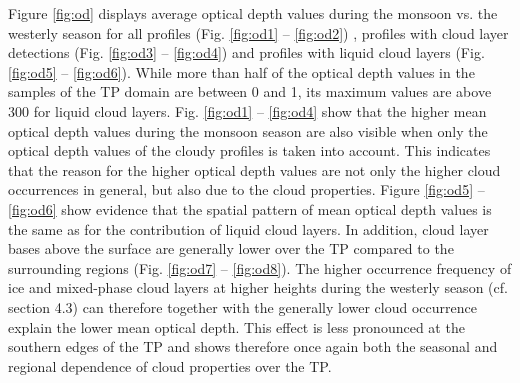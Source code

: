 \documentclass[alpha-refs]{wiley-article}
\begin{document}
Figure \ref{fig:od} displays average optical depth values during the monsoon vs. the westerly season for all profiles (Fig. \ref{fig:od1} -- \ref{fig:od2}) , profiles with cloud layer detections (Fig. \ref{fig:od3} -- \ref{fig:od4}) and profiles with liquid cloud layers (Fig. \ref{fig:od5} -- \ref{fig:od6}). While more than half of the optical depth values in the samples of the TP domain are between 0 and 1, its maximum values are above 300 for liquid cloud layers. Fig. \ref{fig:od1} -- \ref{fig:od4} show that the higher mean optical depth values during the monsoon season are also visible when only the optical depth values of the cloudy profiles is taken into account. This indicates that the reason for the higher optical depth values are not only the higher cloud occurrences in general, but also due to the cloud properties. Figure \ref{fig:od5} -- \ref{fig:od6} show evidence that the spatial pattern of mean optical depth values is the same as for the contribution of liquid cloud layers. In addition, cloud layer bases above the surface are generally lower over the TP compared to the surrounding regions (Fig. \ref{fig:od7} -- \ref{fig:od8}). The higher occurrence frequency of ice and mixed-phase cloud layers at higher heights during the westerly season (cf. section 4.3) can therefore together with the generally lower cloud occurrence explain the lower mean optical depth. This effect is less pronounced at the southern edges of the TP and shows therefore once again both the seasonal and regional dependence of cloud properties over the TP. 
\end{document}
